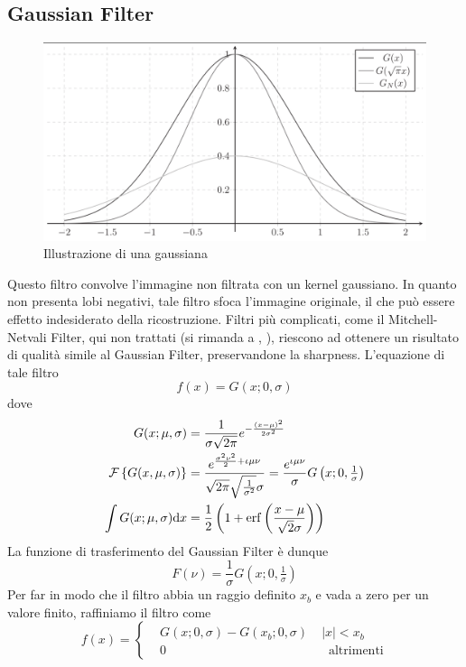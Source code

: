 \subsection{Gaussian Filter}
\begin{figure}[tb]
	\centering
	\includegraphics[width=0.8\linewidth, trim=0px 0px 0px 5px, clip]{../assets/chapter5_reconstruction_gaussian.png}
	\caption{Illustrazione di una gaussiana}
	\label{chapter5:reconstruction:gaussian}
\end{figure}
Questo filtro convolve l'immagine non filtrata con un kernel gaussiano. In quanto non presenta lobi negativi, tale filtro sfoca l'immagine originale, 
il che pu\`o essere effetto indesiderato della ricostruzione. Filtri pi\`u complicati, come il Mitchell-Netvali Filter, qui non trattati 
(si rimanda a \cite{pegoraro}, \cite{pharr}), riescono ad ottenere un risultato di qualit\`a simile al Gaussian Filter, preservandone la sharpness. 
L'equazione di tale filtro
\begin{equation}
	f(x)=G(x;0,\sigma)
\end{equation}
dove 
\begin{align}
	G(x;\mu,\sigma)&=\frac{1}{\sigma\sqrt{2\pi}}e^{-\frac{(x-\mu)^2}{2\sigma^2}}\\
	\mathcal{F}\left\{G(x,\mu,\sigma)\right\}&=\frac{e^{\frac{\sigma^2\nu^2}{2}+\iota\mu\nu}}{\sqrt{2\pi}\sqrt{\tfrac{1}{\sigma^2}}\sigma}=
		\frac{e^{\iota\mu\nu}}{\sigma}G\left(x;0,\tfrac{1}{\sigma}\right)\\
	\int G(x;\mu,\sigma)\mathrm{d}x&=\frac{1}{2}\left(1+\operatorname{erf}\left(\frac{x-\mu}{\sqrt{2}\sigma}\right)\right)
\end{align}
La funzione di trasferimento del Gaussian Filter \`e dunque
\begin{equation}
	F(\nu)=\frac{1}{\sigma}G\left(x;0,\tfrac{1}{\sigma}\right)
\end{equation}
Per far in modo che il filtro abbia un raggio definito $x_b$ e vada a zero per un valore finito, raffiniamo il filtro come 
\begin{equation}
	f(x)=\left\{\begin{aligned}
		&G(x;0,\sigma)-G(x_b;0,\sigma)\;&|x|<x_b\\
		&0 &\;\;\mathrm{altrimenti}
	\end{aligned}\right.
\end{equation}
